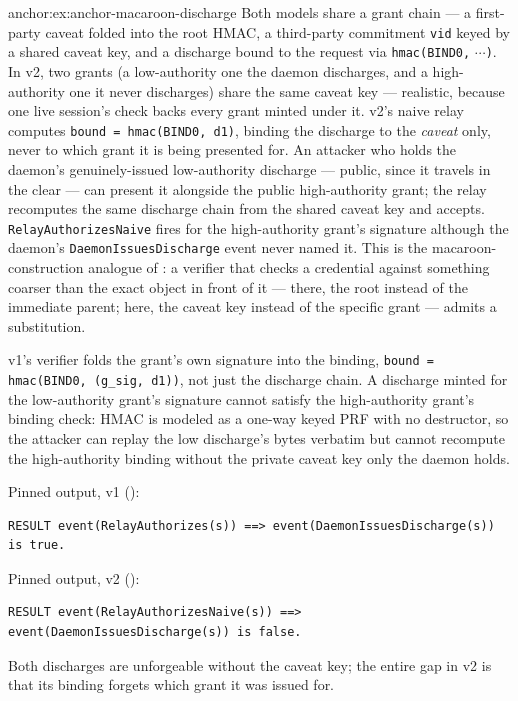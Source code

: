 \begin{pdSolution}{anchor:ex:anchor-macaroon-discharge}
Both models share a grant chain --- a first-party caveat folded into the root HMAC, a third-party commitment \texttt{vid} keyed by a shared caveat key, and a discharge bound to the request via \texttt{hmac(BIND0,} $\cdots$\texttt{)}. In v2, two grants (a low-authority one the daemon discharges, and a high-authority one it never discharges) share the same caveat key --- realistic, because one live session's check backs every grant minted under it. v2's naive relay computes \texttt{bound = hmac(BIND0, d1)}, binding the discharge to the \emph{caveat} only, never to which grant it is being presented for. An attacker who holds the daemon's genuinely-issued low-authority discharge --- public, since it travels in the clear --- can present it alongside the public high-authority grant; the relay recomputes the same discharge chain from the shared caveat key and accepts. \texttt{RelayAuthorizesNaive} fires for the high-authority grant's signature although the daemon's \texttt{DaemonIssuesDischarge} event never named it. This is the macaroon-construction analogue of : a verifier that checks a credential against something coarser than the exact object in front of it --- there, the root instead of the immediate parent; here, the caveat key instead of the specific grant --- admits a substitution.

v1's verifier folds the grant's own signature into the binding, \texttt{bound = hmac(BIND0, (g\_sig, d1))}, not just the discharge chain. A discharge minted for the low-authority grant's signature cannot satisfy the high-authority grant's binding check: HMAC is modeled as a one-way keyed PRF with no destructor, so the attacker can replay the low discharge's bytes verbatim but cannot recompute the high-authority binding without the private caveat key only the daemon holds.

Pinned output, v1 ():
\begin{lstlisting}
RESULT event(RelayAuthorizes(s)) ==> event(DaemonIssuesDischarge(s)) is true.
\end{lstlisting}
Pinned output, v2 ():
\begin{lstlisting}
RESULT event(RelayAuthorizesNaive(s)) ==> event(DaemonIssuesDischarge(s)) is false.
\end{lstlisting}
Both discharges are unforgeable without the caveat key; the entire gap in v2 is that its binding forgets which grant it was issued for.
\end{pdSolution}
